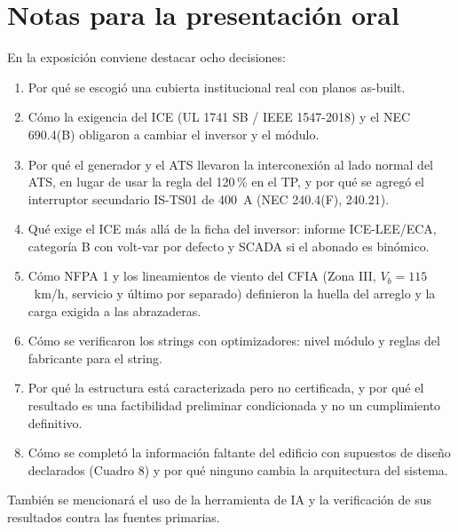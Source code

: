 \section{Notas para la presentación oral}
En la exposición conviene destacar ocho decisiones:
\begin{enumerate}
\item Por qué se escogió una cubierta institucional real con planos as-built.
\item Cómo la exigencia del ICE (UL 1741 SB / IEEE 1547-2018) y el NEC 690.4(B) obligaron a cambiar el inversor y el módulo.
\item Por qué el generador y el ATS llevaron la interconexión al lado normal del ATS, en lugar de usar la regla del 120\,\% en el TP, y por qué se agregó el interruptor secundario IS-TS01 de 400~A (NEC 240.4(F), 240.21).
\item Qué exige el ICE más allá de la ficha del inversor: informe ICE-LEE/ECA, categoría B con volt-var por defecto y SCADA si el abonado es binómico.
\item Cómo NFPA 1 y los lineamientos de viento del CFIA (Zona III, $V_b=115$~km/h, servicio y último por separado) definieron la huella del arreglo y la carga exigida a las abrazaderas.
\item Cómo se verificaron los strings con optimizadores: nivel módulo y reglas del fabricante para el string.
\item Por qué la estructura está caracterizada pero no certificada, y por qué el resultado es una factibilidad preliminar condicionada y no un cumplimiento definitivo.
\item Cómo se completó la información faltante del edificio con supuestos de diseño declarados (Cuadro 8) y por qué ninguno cambia la arquitectura del sistema.
\end{enumerate}
También se mencionará el uso de la herramienta de IA y la verificación de sus resultados contra las fuentes primarias.

